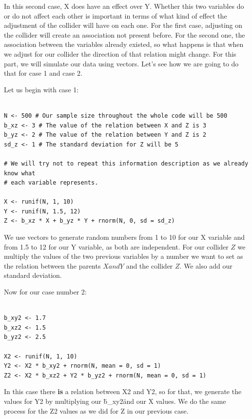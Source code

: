 \documentclass{article}
\begin{document}
In this second case, X does have an effect over Y. Whether this two variables do or do not affect each other is important in terms of what kind of effect the adjustment of the collider will have on each one. For the first case, adjusting on the collider will create an association not present before. For the second one, the association between the variables already existed, so what happens is that when we adjust for our collider the direction of that relation might change. 
For this part, we will simulate our data using vectors. Let's see how we are going to do that for case 1 and case 2.

Let us begin with case 1:

\begin{lstlisting}

N <- 500 # Our sample size throughout the whole code will be 500
b_xz <- 3 # The value of the relation between X and Z is 3
b_yz <- 2 # The value of the relation between Y and Z is 2
sd_z <- 1 # The standard deviation for Z will be 5

# We will try not to repeat this information description as we already know what
# each variable represents.

X <- runif(N, 1, 10)
Y <- runif(N, 1.5, 12)
Z <- b_xz * X + b_yz * Y + rnorm(N, 0, sd = sd_z)

\end{lstlisting}

We use vectors to generate random numbers from 1 to 10 for our X variable and from 1.5 to 12 for our Y variable, as both are independent. For our collider \(Z\) we multiply the values of the two previous variables by a number we want to set as the relation between the parents \(X and Y\) and the collider \(Z\). We also add our standard deviation.

Now for our case number 2:

\begin{lstlisting}

b_xy2 <- 1.7 
b_xz2 <- 1.5
b_yz2 <- 2.5

X2 <- runif(N, 1, 10)
Y2 <- X2 * b_xy2 + rnorm(N, mean = 0, sd = 1)
Z2 <- X2 * b_xz2 + Y2 * b_yz2 + rnorm(N, mean = 0, sd = 1)

\end{lstlisting}

In this case there \textbf{is} a relation between X2 and Y2, so for that, we  generate the values for Y2 by multiplying our \"b\_xy2\" and our X values. We  do the same process for the Z2 values as we did for Z in our previous case.
\end{document}
